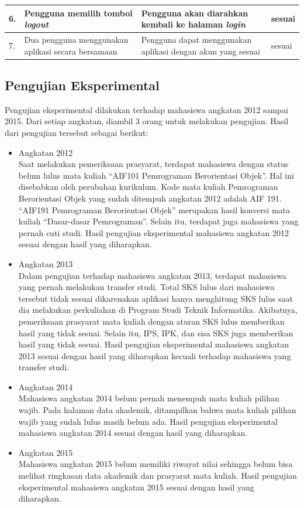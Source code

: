 \begin{table}[H]
\begin{tabular}{|p{0.25cm}| p{3.5cm}| p{7cm}| p{2.5cm}|}
				6.	&	Pengguna memilih tombol \textit{logout}	&	Pengguna akan diarahkan kembali ke halaman \textit{login} &	sesuai	\\ \hline
				7.	& Dua pengguna menggunakan aplikasi secara bersamaan	&	Pengguna dapat menggunakan aplikasi dengan akun yang sesuai &	sesuai	\\ \hline
				\end{tabular}
				\label{table:hasilFungsional}
			\end{table}
			
		\subsection{Pengujian Eksperimental} 
		Pengujian eksperimental dilakukan terhadap mahasiswa angkatan 2012 sampai 2015. Dari setiap angkatan, diambil 3 orang untuk melakukan pengujian. Hasil dari pengujian tersebut sebagai berikut:
		\begin{itemize}
			\item Angkatan 2012\\
			Saat melakukan pemeriksaan prasyarat, terdapat mahasiswa dengan status belum lulus mata kuliah ``AIF101 Pemrograman Berorientasi Objek''. Hal ini disebabkan oleh perubahan kurikulum. Kode mata kuliah Pemrograman Berorientasi Objek yang sudah ditempuh angkatan 2012 adalah AIF 191. ``AIF191 Pemrograman Berorientasi Objek'' merupakan hasil konversi mata kuliah ``Dasar-dasar Pemrograman''. Selain itu, terdapat juga mahasiswa yang pernah cuti studi. Hasil pengujian eksperimental mahasiswa angkatan 2012 sesuai dengan hasil yang diharapkan.
			\item Angkatan 2013\\
			Dalam pengujian terhadap mahasiswa angkatan 2013, terdapat mahasiswa yang pernah melakukan transfer studi. Total SKS lulus dari mahasiswa tersebut tidak sesuai dikarenakan aplikasi hanya menghitung SKS lulus saat dia melakukan perkuliahan di Program Studi Teknik Informatika. Akibatnya, pemeriksaan prasyarat mata kuliah dengan aturan SKS lulus memberikan hasil yang tidak sesuai. Selain itu, IPS, IPK, dan sisa SKS juga memberikan hasil yang tidak sesuai. Hasil pengujian eksperimental mahasiswa angkatan 2013 sesuai dengan hasil yang diharapkan kecuali terhadap mahasiswa yang transfer studi.
			\item Angkatan 2014\\
			Mahasiswa angkatan 2014 belum pernah menempuh mata kuliah pilihan wajib. Pada halaman data akademik, ditampilkan bahwa mata kuliah pilihan wajib yang sudah lulus masih belum ada. Hasil pengujian eksperimental mahasiswa angkatan 2014 sesuai dengan hasil yang diharapkan.
			\item Angkatan 2015\\
			Mahasiswa angkatan 2015 belum memiliki riwayat nilai sehingga belum bisa melihat ringkasan data akademik dan prasyarat mata kuliah. Hasil pengujian eksperimental mahasiswa angkatan 2015 sesuai dengan hasil yang diharapkan.
		\end{itemize}